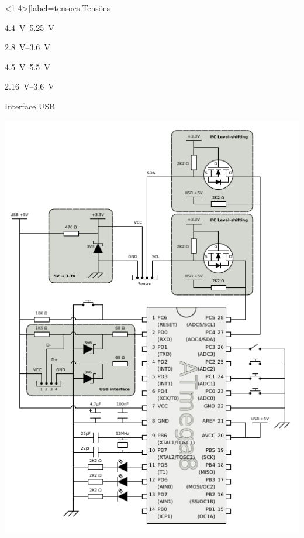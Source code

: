 \documentclass{beamer}
\newcommand*{\VBUS}{V\textsubscript{BUS}\xspace}
\begin{document}
\begin{frame}<1-4>[label=tensoes]{Tensões}
	\pause
	\begin{description}[<+->][HMC5883L]
		\item[USB \VBUS] \SIrange{4.4}{5.25}{\volt}
		\item[USB data]  \SIrange{2.8}{3.6}{\volt}
		\item[ATmega8]   \SIrange{4.5}{5.5}{\volt}
		\item[HMC5883L]  \SIrange{2.16}{3.6}{\volt}
	\end{description}
\end{frame}


\begin{frame}{Interface USB}
	\begin{center}
		\includegraphics[keepaspectratio, width=1.0\textwidth, height=0.8\textheight, clip, viewport=0.00in 1.15in 2.66in 2.66in]{../monografia/img/AVR-magnetometer-usb-mouse.pdf}
	\end{center}
\end{frame}
\end{document}
